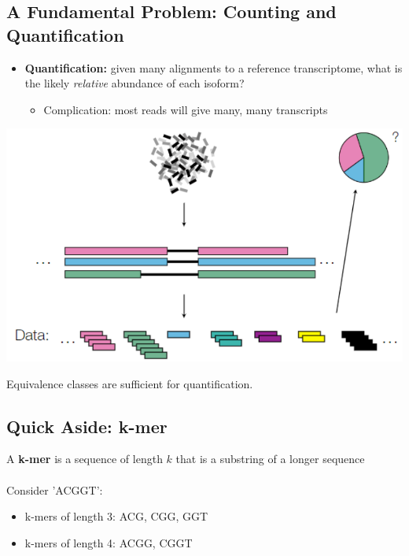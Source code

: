 \documentclass[10pt]{article}
\begin{document}
\subsection*{A Fundamental Problem: Counting and Quantification}
\begin{itemize}
    \item \textbf{Quantification:} given many alignments to a reference transcriptome, what is the likely \textit{relative} abundance of each isoform?
    \begin{itemize}
        \item Complication: most reads will give many, many transcripts
    \end{itemize}
\end{itemize}
\begin{center}
    \includegraphics*[scale=0.75]{W4_2.png}
\end{center}
Equivalence classes are sufficient for quantification.

\subsection*{Quick Aside: k-mer}
A \textbf{k-mer} is a sequence of length $k$ that is a substring of a longer sequence\\\\
Consider 'ACGGT':
\begin{itemize}
    \item k-mers of length 3: ACG, CGG, GGT
    \item k-mers of length 4: ACGG, CGGT
\end{itemize}
\end{document}
